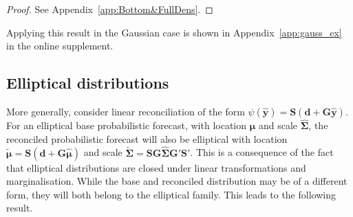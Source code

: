 \documentclass[a4paper,12pt]{article}
\theoremstyle{definition}
\begin{document}
\begin{proof}
	See Appendix~\ref{app:Bottom&FullDens}.
\end{proof}

Applying this result in the Gaussian case is shown in Appendix~\ref{app:gauss_ex} in the online supplement.

\subsection{Elliptical distributions}\label{sec:elliptical}

More generally, consider linear reconciliation of the form $\psi(\hat{\bm{y}})=\bm{S}(\bm{d}+\bm{G}\hat{\bm{y}})$. For an elliptical base probabilistic forecast, with location $\hat{\bm\mu}$ and scale $\hat{\bm\Sigma}$, the reconciled probabilistic forecast will also be elliptical with location $\tilde{\bm{\mu}}=\bm{S}(\bm{d}+\bm{G}\hat{\bm{\mu}})$ and scale $\tilde{\bm{\Sigma}}=\bm{S}\bm{G}\hat{\bm{\Sigma}}\bm{G}'\bm{S}'$. This is a consequence of the fact that elliptical distributions are closed under linear transformations and marginalisation. While the base and reconciled distribution may be of a different form, they will both belong to the elliptical family. This leads to the following result.
\end{document}

